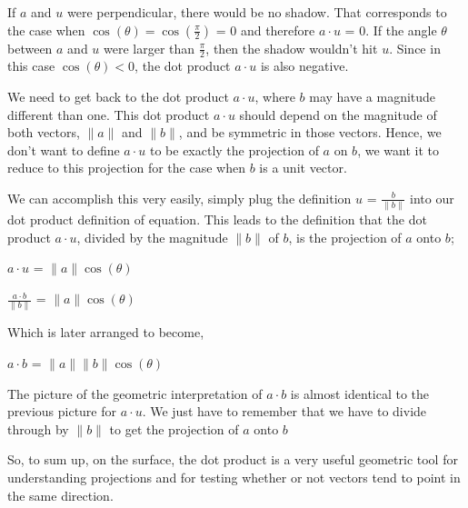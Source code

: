 \documentclass[12pt]{article}
\begin{document}
If $a$ and $u$ were perpendicular, there would be no shadow. That corresponds to the case when $\cos(\theta) = \cos(\frac{\pi}{2})$ = $0$ and therefore $a \cdot u$ = $0$. If the angle $\theta$ between $a$ and $u$ were larger than $\frac{\pi}{2}$, then the shadow wouldn't hit $u$. Since in this case $\cos(\theta) < 0$, the dot product $a \cdot u$ is also negative.

We need to get back to the dot product $a \cdot u$, where $b$ may have a magnitude different than one. This dot product $a \cdot u$ should depend on the magnitude of both vectors, $\| a \|$ and $\| b \|$, and be symmetric in those vectors. Hence, we don't want to define $a \cdot u$ to be exactly the projection of $a$ on $b$, we want it to reduce to this projection for the case when $b$ is a unit vector. 

We can accomplish this very easily, simply plug the definition $u$ = $\frac{b}{\| b \|}$ into our dot product definition of equation. This leads to the definition that the dot product $a \cdot u$, divided by the magnitude $\| b \|$ of $b$, is the projection of $a$ onto $b$;

\begin{center}
    $a \cdot u$ = $\| a \| \cos(\theta)$
    
    $\frac{a \cdot b}{\| b \|}$ = $\| a \| \cos(\theta)$
\end{center}

Which is later arranged to become,

\begin{center}
    $a \cdot b$ = $\| a \| \| b \| \cos(\theta)$
\end{center}

The picture of the geometric interpretation of $a \cdot b$ is almost identical to the previous picture for $a \cdot u$. We just have to remember that we have to divide through by $\| b \|$ to get the projection of $a$ onto $b$


So, to sum up, on the surface, the dot product is a very useful geometric tool for understanding projections and for testing whether or not vectors tend to point in the same direction.
\end{document}
